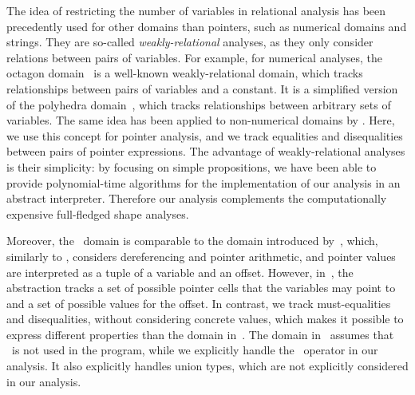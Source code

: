 The idea of restricting the number of variables in relational analysis has been precedently used
for other domains than pointers, such as numerical domains and strings.
They are so-called \emph{weakly-relational} analyses, as they only consider relations between pairs of variables.
For example, for numerical analyses, the octagon domain~\cite{octagon} is a well-known weakly-relational domain,
which tracks relationships between pairs of variables and a constant.
It is a simplified version of the polyhedra domain~\cite{polyhedra}, which tracks relationships between arbitrary sets of variables.
The same idea has been applied to non-numerical domains by \textcite{SeidlETS2023}.
Here, we use this concept for pointer analysis, and we track equalities and disequalities between pairs of pointer expressions.
The advantage of weakly-relational analyses is their simplicity:
by focusing on simple propositions, we have been able to provide polynomial-time algorithms for the implementation of our analysis in an abstract interpreter.
Therefore our analysis complements the computationally expensive full-fledged shape analyses.

Moreover, the \cpo\ domain is comparable to the domain introduced by~\textcite{Mine06}, which, similarly to \cpo, considers dereferencing and pointer arithmetic, and pointer values are interpreted as a tuple of a variable and an offset.
However, in~\cite{Mine06}, the abstraction tracks
a set of possible pointer cells that the variables may point to and a set of possible values for the offset.
In contrast, we track must-equalities and disequalities, without considering concrete values,
which makes it possible to express different properties than the domain in~\cite{Mine06}.
The domain in~\cite{Mine06} assumes that \malloc\ is not used in the program,
while we explicitly handle the \malloc\ operator in our analysis.
It also explicitly handles union types, which are not explicitly considered in our analysis.
